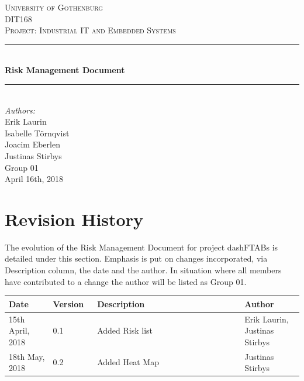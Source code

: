 \documentclass[12pt]{article}
\begin{document}
\begin{titlepage}

\newcommand{\Line}{\rule{\linewidth}{0.5mm}} 

\center
 
\textsc{\LARGE University of Gothenburg}
\\[3.5cm] 

\textsc{\Large DIT168}\\[0.3cm]
\textsc{\large Project: Industrial IT and Embedded Systems}\\[0.5cm]

\Line \\[0.4cm]
{\huge \bfseries Risk Management Document}\\[0.4cm]
\Line \\[0.5cm]
 
\Large \textit{Authors:}
\\Erik Laurin
\\Isabelle Törnqvist
\\Joacim Eberlen
\\Justinas Stirbys \\[4cm]

{\large Group 01} \\[0.3cm]
{\large April 16th, 2018}

\vfill

\end{titlepage}

\tableofcontents
\pagebreak


\section{Revision History}
The evolution of the Risk Management Document for project dashFTABs is detailed under this section. Emphasis is put on changes incorporated, via Description column, the date and the author. In situation where all members have contributed to a change the author will be listed as Group 01.
\begin{longtable}{ | p{0.15\linewidth} | p{0.15\linewidth} | p{0.5\linewidth} | p{0.2\linewidth} | }\hline 
    
    \textbf{Date} & \textbf{Version} & \textbf{Description} & \textbf{Author} \\ \hline
    15th April, 2018 & 0.1 & Added Risk list & Erik Laurin,  Justinas Stirbys\\ \hline
   	18th May, 2018 & 0.2 & Added Heat Map & Justinas Stirbys\\ \hline

\end{longtable}
\pagebreak
\end{document}

